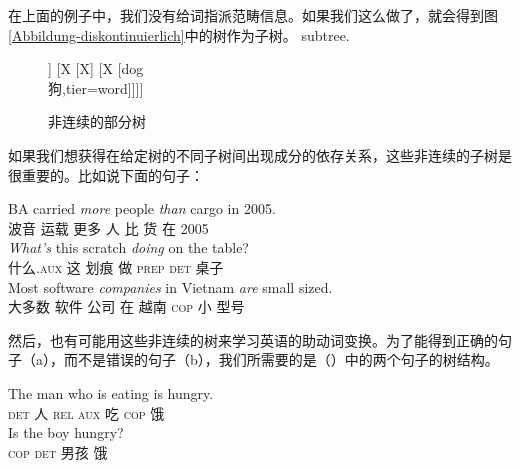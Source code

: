 在上面的例子中，我们没有给词指派范畴信息。如果我们这么做了，就会得到图\vref{Abbildung-diskontinuierlich}中的树作为子树。
subtree.
\begin{figure}
\centering
\begin{forest}
[X
	[X
		[watch\\
		看,tier=word]]
	[X
		[X]
		[X
			[dog\\
			 狗,tier=word]]]]
\end{forest}
\caption{\label{Abbildung-diskontinuierlich}非连续的部分树}
\end{figure}%
如果我们想获得在给定树的不同子树间出现成分的依存关系，这些非连续的子树是很重要的。比如说下面的句子：

\eal
\ex 
\gll BA carried \emph{more} people \emph{than} cargo in 2005.\\
波音 运载 更多 人 比 货 在 2005\\
\ex 
\gll \emph{What's} this scratch \emph{doing} on the table?\\
什么.\textsc{aux} 这 划痕 做 \textsc{prep} \textsc{det} 桌子\\
\ex 
\gll Most software \emph{companies} in Vietnam \emph{are} small sized.\\
大多数 软件 公司 在 越南 \textsc{cop} 小 型号\\
\zl

\noindent
然后，也有可能用这些非连续的树来学习英语的助动词变换。为了能得到正确的句子（a），而不是错误的句子（b），我们所需要的是（）中的两个句子的树结构。

\eal
\label{Beispiel-Inversion}
\ex 
\gll The man who is eating is hungry.\\
\textsc{det} 人 \textsc{rel} \textsc{aux} 吃 \textsc{cop} 饿\\
\ex 
\gll Is the boy hungry?\\
\textsc{cop} \textsc{det} 男孩 饿\\
\zl


